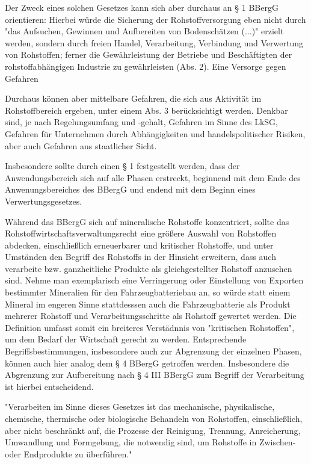\documentclass[12pt,a4paper,oneside]{book} %
\begin{document}
Der Zweck eines solchen Gesetzes kann sich aber durchaus an § 1 BBergG orientieren: Hierbei würde die Sicherung der Rohstoffversorgung eben nicht durch "das Aufsuchen, Gewinnen und Aufbereiten von Bodenschätzen (...)" erzielt werden, sondern durch freien Handel, Verarbeitung, Verbindung und Verwertung von Rohstoffen; ferner die Gewährleistung der Betriebe und Beschäftigten der rohstoffabhängigen Industrie zu gewährleisten (Abs. 2). Eine Versorge gegen Gefahren

Durchaus können aber mittelbare Gefahren, die sich aus Aktivität im Rohstoffbereich ergeben, unter einem Abs. 3 berücksichtigt werden. Denkbar sind, je nach Regelungsumfang und -gehalt, Gefahren im Sinne des LkSG, Gefahren für Unternehmen durch Abhängigkeiten und handelspolitischer Risiken, aber auch Gefahren aus staatlicher Sicht.

Insbesondere sollte durch einen § 1 festgestellt werden, dass der Anwendungsbereich sich auf alle Phasen erstreckt, beginnend mit dem Ende des Anwenungsbereiches des BBergG und endend mit dem Beginn eines Verwertungsgesetzes.

Während das BBergG sich auf mineralische Rohstoffe konzentriert, sollte das Rohstoffwirtschaftsverwaltungsrecht eine größere Auswahl von Rohstoffen abdecken, einschließlich erneuerbarer und kritischer Rohstoffe, und unter Umständen den Begriff des Rohstoffs in der Hinsicht erweitern, dass auch verarbeite bzw. ganzheitliche Produkte als gleichgestellter Rohstoff anzusehen sind. Nehme man exemplarisch eine Verringerung oder Einstellung von Exporten bestimmter Mineralien für den Fahrzeugbatteriebau an, so würde statt einem Mineral im engeren Sinne stattdesssen auch die Fahrzeugbatterie als Produkt mehrerer Rohstoff und Verarbeitungsschritte als Rohstoff gewertet werden. Die Definition umfasst somit ein breiteres Verstädnnis von "kritischen Rohstoffen", um dem Bedarf der Wirtschaft gerecht zu werden. Entsprechende Begriffsbestimmungen, insbesondere auch zur Abgrenzung der einzelnen Phasen, können auch hier analog dem § 4 BBergG getroffen werden. Insbesondere die Abgrenzung zur Aufbereitung nach § 4 III BBergG zum Begriff der Verarbeitung ist hierbei entscheidend.

"Verarbeiten im Sinne dieses Gesetzes ist das mechanische, physikalische, chemische, thermische oder biologische Behandeln von Rohstoffen, einschließlich, aber nicht beschränkt auf, die Prozesse der Reinigung, Trennung, Anreicherung, Umwandlung und Formgebung, die notwendig sind, um Rohstoffe in Zwischen- oder Endprodukte zu überführen."
\end{document}
